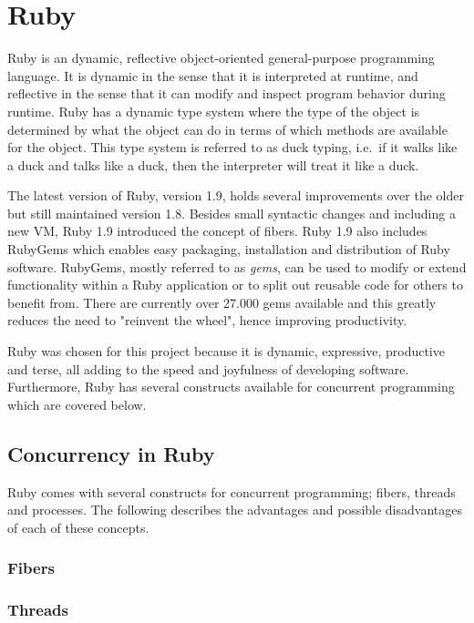 \section{Ruby} %
\label{sec:ruby}

Ruby is an dynamic, reflective object-oriented general-purpose programming
language. It is dynamic in the sense that it is interpreted at runtime, and
reflective in the sense that it can modify and inspect program behavior during
runtime.  Ruby has a dynamic type system where the type of the object is
determined by what the object can do in terms of which methods are available
for the object. This type system is referred to as duck typing, i.e.\ if it
walks like a duck and talks like a duck, then the interpreter will treat it
like a duck.

The latest version of Ruby, version 1.9, holds several improvements over the
older but still maintained version 1.8. Besides small syntactic changes and
including a new VM, Ruby 1.9 introduced the concept of fibers. Ruby 1.9 also
includes RubyGems which enables easy packaging, installation and distribution of
Ruby software. RubyGems, mostly referred to as \textit{gems}, can be used to
modify or extend functionality within a Ruby application or to split out
reusable code for others to benefit from. There are currently over 27.000 gems
available and this greatly reduces the need to "reinvent the wheel", hence
improving productivity. 

Ruby was chosen for this project because it is dynamic, expressive, productive
and terse, all adding to the speed and joyfulness of developing software.
Furthermore, Ruby has several constructs available for concurrent programming
which are covered below.

\subsection{Concurrency in Ruby}
Ruby comes with several constructs for concurrent programming; fibers, threads
and processes. The following describes the advantages and possible disadvantages
of each of these concepts.

\subsubsection{Fibers}

\subsubsection{Threads}

